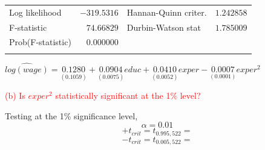 \documentclass[12pt]{report}
\begin{document}
\begin{table}[H]
\begin{tabular}{lrrrr}
		\multicolumn{1}{l}{Log likelihood}&\multicolumn{1}{r}{$-319.5316$}&\multicolumn{2}{l}{Hannan-Quinn criter.}&\multicolumn{1}{r}{$1.242858$}\\
		\multicolumn{1}{l}{F-statistic}&\multicolumn{1}{r}{$74.66829$}&\multicolumn{2}{l}{Durbin-Watson stat}&\multicolumn{1}{r}{$1.785009$}\\
		\multicolumn{1}{l}{Prob(F-statistic)}&\multicolumn{1}{r}{$0.000000$}&\multicolumn{1}{c}{}&\multicolumn{1}{c}{}&\multicolumn{1}{c}{}\\
		[4.5pt] \hline \\ [-4.5pt]
	\end{tabular}
\end{table}
\centering $\widehat{log(wage)} = \underset{(0.1059)}{0.1280} + \underset{(0.0075)}{0.0904}educ + \underset{(0.0052)}{0.0410}exper - \underset{(0.0001)}{0.0007}exper^2$

\justify \noindent \textcolor{red}{(b) Is $exper^2$ statistically significant at the 1\% level?}
\vspace{40mm}

\newpage
\noindent Testing at the 1\% significance level,
$$\alpha = 0.01$$
$$+t_{crit} = t_{0.995,522} =$$
$$-t_{crit} = t_{0.005,522} =$$
\end{document}
